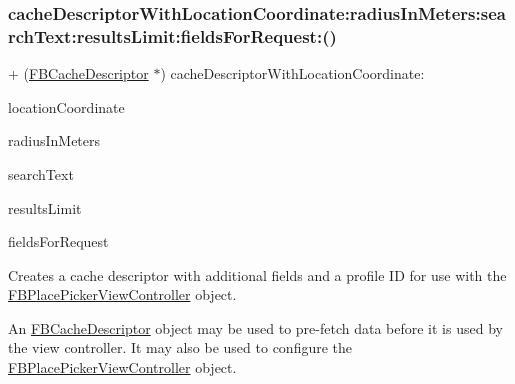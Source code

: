 \subsubsection{\texorpdfstring{cache\+Descriptor\+With\+Location\+Coordinate\+:radius\+In\+Meters\+:search\+Text\+:results\+Limit\+:fields\+For\+Request\+:()}{cacheDescriptorWithLocationCoordinate:radiusInMeters:searchText:resultsLimit:fieldsForRequest:()}\hspace{0.1cm}{\footnotesize\ttfamily [3/5]}}
{\footnotesize\ttfamily + (\hyperlink{interfaceFBCacheDescriptor}{F\+B\+Cache\+Descriptor} $\ast$) cache\+Descriptor\+With\+Location\+Coordinate\+: \begin{DoxyParamCaption}\item[{(C\+L\+Location\+Coordinate2D)}]{location\+Coordinate }\item[{radiusInMeters:(N\+S\+Integer)}]{radius\+In\+Meters }\item[{searchText:(N\+S\+String $\ast$)}]{search\+Text }\item[{resultsLimit:(N\+S\+Integer)}]{results\+Limit }\item[{fieldsForRequest:(N\+S\+Set $\ast$)}]{fields\+For\+Request }\end{DoxyParamCaption}}

Creates a cache descriptor with additional fields and a profile ID for use with the {\ttfamily \hyperlink{interfaceFBPlacePickerViewController}{F\+B\+Place\+Picker\+View\+Controller}} object.

An {\ttfamily \hyperlink{interfaceFBCacheDescriptor}{F\+B\+Cache\+Descriptor}} object may be used to pre-\/fetch data before it is used by the view controller. It may also be used to configure the {\ttfamily \hyperlink{interfaceFBPlacePickerViewController}{F\+B\+Place\+Picker\+View\+Controller}} object.


